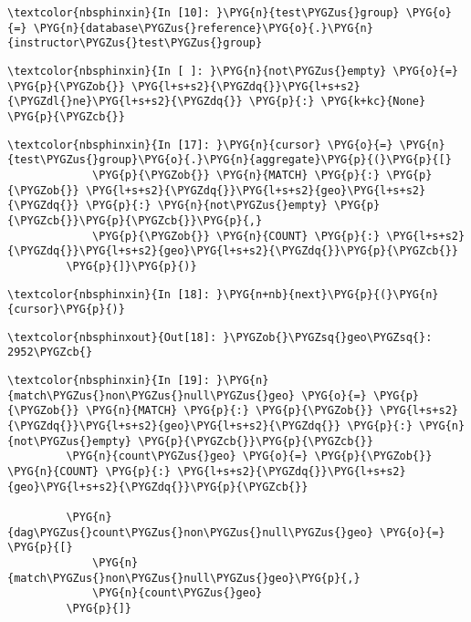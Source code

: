 \documentclass[letterpaper,10pt,english]{sphinxmanual}
\begin{document}
%
\begin{Verbatim}[commandchars=\\\{\}]
\textcolor{nbsphinxin}{In [10]: }\PYG{n}{test\PYGZus{}group} \PYG{o}{=} \PYG{n}{database\PYGZus{}reference}\PYG{o}{.}\PYG{n}{instructor\PYGZus{}test\PYGZus{}group}
\end{Verbatim}

%
\begin{Verbatim}[commandchars=\\\{\}]
\textcolor{nbsphinxin}{In [ ]: }\PYG{n}{not\PYGZus{}empty} \PYG{o}{=} \PYG{p}{\PYGZob{}} \PYG{l+s+s2}{\PYGZdq{}}\PYG{l+s+s2}{\PYGZdl{}ne}\PYG{l+s+s2}{\PYGZdq{}} \PYG{p}{:} \PYG{k+kc}{None} \PYG{p}{\PYGZcb{}}
\end{Verbatim}

%
\begin{Verbatim}[commandchars=\\\{\}]
\textcolor{nbsphinxin}{In [17]: }\PYG{n}{cursor} \PYG{o}{=} \PYG{n}{test\PYGZus{}group}\PYG{o}{.}\PYG{n}{aggregate}\PYG{p}{(}\PYG{p}{[}
             \PYG{p}{\PYGZob{}} \PYG{n}{MATCH} \PYG{p}{:} \PYG{p}{\PYGZob{}} \PYG{l+s+s2}{\PYGZdq{}}\PYG{l+s+s2}{geo}\PYG{l+s+s2}{\PYGZdq{}} \PYG{p}{:} \PYG{n}{not\PYGZus{}empty} \PYG{p}{\PYGZcb{}}\PYG{p}{\PYGZcb{}}\PYG{p}{,}
             \PYG{p}{\PYGZob{}} \PYG{n}{COUNT} \PYG{p}{:} \PYG{l+s+s2}{\PYGZdq{}}\PYG{l+s+s2}{geo}\PYG{l+s+s2}{\PYGZdq{}}\PYG{p}{\PYGZcb{}}
         \PYG{p}{]}\PYG{p}{)}
\end{Verbatim}

%
\begin{Verbatim}[commandchars=\\\{\}]
\textcolor{nbsphinxin}{In [18]: }\PYG{n+nb}{next}\PYG{p}{(}\PYG{n}{cursor}\PYG{p}{)}
\end{Verbatim}

%
\begin{Verbatim}[commandchars=\\\{\}]
\textcolor{nbsphinxout}{Out[18]: }\PYGZob{}\PYGZsq{}geo\PYGZsq{}: 2952\PYGZcb{}
\end{Verbatim}

%
\begin{Verbatim}[commandchars=\\\{\}]
\textcolor{nbsphinxin}{In [19]: }\PYG{n}{match\PYGZus{}non\PYGZus{}null\PYGZus{}geo} \PYG{o}{=} \PYG{p}{\PYGZob{}} \PYG{n}{MATCH} \PYG{p}{:} \PYG{p}{\PYGZob{}} \PYG{l+s+s2}{\PYGZdq{}}\PYG{l+s+s2}{geo}\PYG{l+s+s2}{\PYGZdq{}} \PYG{p}{:} \PYG{n}{not\PYGZus{}empty} \PYG{p}{\PYGZcb{}}\PYG{p}{\PYGZcb{}}
         \PYG{n}{count\PYGZus{}geo} \PYG{o}{=} \PYG{p}{\PYGZob{}} \PYG{n}{COUNT} \PYG{p}{:} \PYG{l+s+s2}{\PYGZdq{}}\PYG{l+s+s2}{geo}\PYG{l+s+s2}{\PYGZdq{}}\PYG{p}{\PYGZcb{}}
         
         \PYG{n}{dag\PYGZus{}count\PYGZus{}non\PYGZus{}null\PYGZus{}geo} \PYG{o}{=} \PYG{p}{[}
             \PYG{n}{match\PYGZus{}non\PYGZus{}null\PYGZus{}geo}\PYG{p}{,}
             \PYG{n}{count\PYGZus{}geo}
         \PYG{p}{]}
\end{Verbatim}
\end{document}
